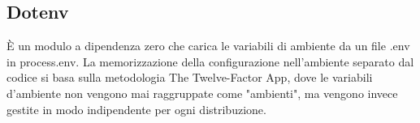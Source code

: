 \subsection{Dotenv}
È un modulo a dipendenza zero che carica le variabili di ambiente da un file .env in process.env. La memorizzazione della configurazione nell'ambiente separato dal codice si basa sulla metodologia The Twelve-Factor App, dove le variabili d'ambiente non vengono mai raggruppate come "ambienti", ma vengono invece gestite in modo indipendente per ogni distribuzione.

